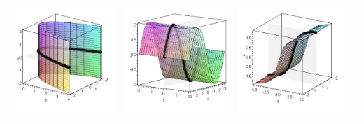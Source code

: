 \begin{center}
\begin{tabular}{cccc}
\includegraphics[width=\mywidth]{functions/cylinder-1}&
\includegraphics[width=\mywidth]{functions/cylinder-2}&
\includegraphics[width=\mywidth]{functions/cylinder-3}&

\end{tabular}
\end{center}
